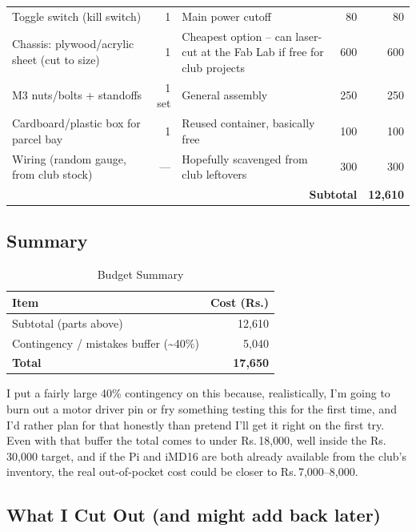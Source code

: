 \documentclass[12pt,a4paper]{article}
\begin{document}
\begin{longtable}{@{}p{4.6cm}rp{3.6cm}rr@{}}
Toggle switch (kill switch) & 1 & Main power cutoff & 80 & 80 \\
Chassis: plywood/acrylic sheet (cut to size) & 1 & Cheapest option -- can laser-cut at the Fab Lab if free for club projects & 600 & 600 \\
M3 nuts/bolts + standoffs  & 1 set & General assembly & 250 & 250 \\
Cardboard/plastic box for parcel bay & 1 & Reused container, basically free & 100 & 100 \\
Wiring (random gauge, from club stock) & --- & Hopefully scavenged from club leftovers & 300 & 300 \\
\midrule
\multicolumn{4}{r}{\textbf{Subtotal}} & \textbf{12{,}610} \\
\end{longtable}

\subsection{Summary}

\begin{table}[ht]
\centering
\caption{Budget Summary}
\label{tab:bom_summary}
\renewcommand{\arraystretch}{1.3}
\begin{tabular}{@{}lr@{}}
\toprule
\textbf{Item} & \textbf{Cost (Rs.)} \\
\midrule
Subtotal (parts above)        & 12{,}610 \\
Contingency / mistakes buffer (\textasciitilde40\%) & 5{,}040 \\
\midrule
\textbf{Total}                 & \textbf{17{,}650} \\
\bottomrule
\end{tabular}
\end{table}

I put a fairly large 40\% contingency on this because, realistically, I'm going to burn
out a motor driver pin or fry something testing this for the first time, and I'd rather
plan for that honestly than pretend I'll get it right on the first try. Even with that
buffer the total comes to under Rs.\,18{,}000, well inside the Rs.\,30{,}000 target, and
if the Pi and iMD16 are both already available from the club's inventory, the real
out-of-pocket cost could be closer to Rs.\,7{,}000--8{,}000.

\subsection{What I Cut Out (and might add back later)}
\end{document}

